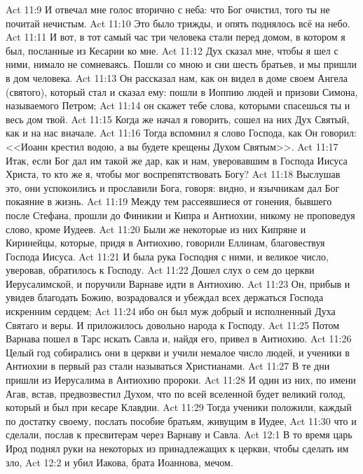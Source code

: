 \vs Act 11:9 И отвечал мне голос вторично с неба: что Бог очистил, того ты не почитай нечистым.
\vs Act 11:10 Это было трижды, и опять поднялось всё на небо.
\vs Act 11:11 И вот, в тот самый час три человека стали перед домом, в котором я был, посланные из Кесарии ко мне.
\vs Act 11:12 Дух сказал мне, чтобы я шел с ними, нимало не сомневаясь. Пошли со мною и сии шесть братьев, и мы пришли в дом  человека.
\vs Act 11:13 Он рассказал нам, как он видел в доме своем Ангела (святого), который стал и сказал ему: пошли в Иоппию людей и призови Симона, называемого Петром;
\vs Act 11:14 он скажет тебе слова, которыми спасешься ты и весь дом твой.
\vs Act 11:15 Когда же начал я говорить, сошел на них Дух Святый, как и на нас вначале.
\vs Act 11:16 Тогда вспомнил я слово Господа, как Он говорил: <<Иоанн крестил водою, а вы будете крещены Духом Святым>>.
\vs Act 11:17 Итак, если Бог дал им такой же дар, как и нам, уверовавшим в Господа Иисуса Христа, то кто же я, чтобы мог воспрепятствовать Богу?
\vs Act 11:18 Выслушав это, они успокоились и прославили Бога, говоря: видно, и язычникам дал Бог покаяние в жизнь.
\rsbpar\vs Act 11:19 Между тем рассеявшиеся от гонения, бывшего после Стефана, прошли до Финикии и Кипра и Антиохии, никому не проповедуя слово, кроме Иудеев.
\vs Act 11:20 Были же некоторые из них Кипряне и Киринейцы, которые, придя в Антиохию, говорили Еллинам, благовествуя Господа Иисуса.
\vs Act 11:21 И была рука Господня с ними, и великое число, уверовав, обратилось к Господу.
\vs Act 11:22 Дошел слух о сем до церкви Иерусалимской, и поручили Варнаве идти в Антиохию.
\vs Act 11:23 Он, прибыв и увидев благодать Божию, возрадовался и убеждал всех держаться Господа искренним сердцем;
\vs Act 11:24 ибо он был муж добрый и исполненный Духа Святаго и веры. И приложилось довольно народа к Господу.
\vs Act 11:25 Потом Варнава пошел в Тарс искать Савла и, найдя его, привел в Антиохию.
\vs Act 11:26 Целый год собирались они в церкви и учили немалое число людей, и ученики в Антиохии в первый раз стали называться Христианами.
\rsbpar\vs Act 11:27 В те дни пришли из Иерусалима в Антиохию пророки.
\vs Act 11:28 И один из них, по имени Агав, встав, предвозвестил Духом, что по всей вселенной будет великий голод, который и был при кесаре Клавдии.
\vs Act 11:29 Тогда ученики положили, каждый по достатку своему, послать пособие братьям, живущим в Иудее,
\vs Act 11:30 что и сделали, послав  к пресвитерам через Варнаву и Савла.
\vs Act 12:1 В то время царь Ирод поднял руки на некоторых из принадлежащих к церкви, чтобы сделать им зло,
\vs Act 12:2 и убил Иакова, брата Иоаннова, мечом.

